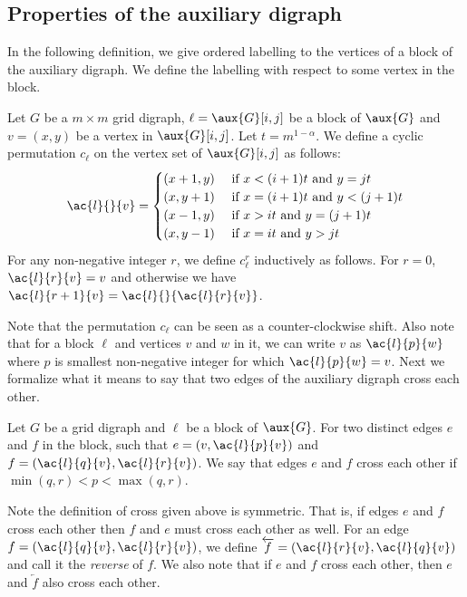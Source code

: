 \documentclass{toc}
\begin{document}
%

%
\subsection{Properties of the auxiliary digraph} %
In the following definition, we give ordered labelling to the vertices of a block of the auxiliary 
digraph. %
We define the labelling with respect to some vertex 
%
in the block.
\begin{definition}
\label{def:perm}
Let $G$ be a $m \times m$ grid 
digraph, %
$\ell = \aux{G}[i,j]$ be a block of $\aux{G}$ and $v = (x, y)$ be a vertex in $\aux{G}[i,j]$. Let $t = m^{1-\alpha}$. We define a cyclic permutation $c_{\ell}$ on the vertex set of $\aux{G}[i,j]$ as follows:
\[ \ac{l}{}{v} = \begin{cases} (x +1 , y) &\text{ if } x < (i + 1)t \textup{ and } y = jt\\
(x, y +1)&\text{ if } x = (i + 1)t \textup{ and } y < (j + 1)t\\
(x-1, y) &\text{ if } x > it \textup{ and } y = (j + 1)t \\
(x, y -1)&\text{ if } x = it \textup{ and } y > jt \end{cases}\]
For any non-negative integer $r$, we define $c_{\ell}^r$ inductively as follows. For $r = 0$, $\ac{l}{r}{v} = v$ and otherwise we have $\ac{l}{r+1}{v} = \ac{l}{}{\ac{l}{r}{v}}$.
\end{definition}

 Note that the permutation $c_{\ell}$ can be seen as a counter-clockwise shift. Also note that for a block $\ell$ and vertices $v$ and $w$ in it, we can write $v$ as $\ac{l}{p}{w}$ where $p$ is smallest non-negative integer for which $\ac{l}{p}{w} = v$. Next we formalize what it means to say that two edges of the auxiliary %
digraph %
cross each other.

\begin{definition}
\label{def:cross}
Let $G$ be a grid 
digraph %
and $\ell$ be a block of $\aux{G}$. For two distinct edges $e$ and $f$ in the block, such that $e = (v, \ac{l}{p}{v})$ and $f = (\ac{l}{q}{v}, \ac{l}{r}{v})$. We say that edges $e$ and $f$ cross each other if $\min(q, r) < p < \max(q, r)$.
\end{definition}

Note the definition of cross given above is symmetric. That is, if edges $e$ and $f$ cross each other then $f$ and $e$ must cross each other as well. For an edge $f = (\ac{l}{q}{v}, \ac{l}{r}{v})$, we define $\overleftarrow{f} = (\ac{l}{r}{v}, \ac{l}{q}{v})$ and call it the \emph{reverse} of $f$. We also note that if $e$ and $f$ cross each other, then $e$ and $\overleftarrow{f}$ also cross each other.
\end{document}
